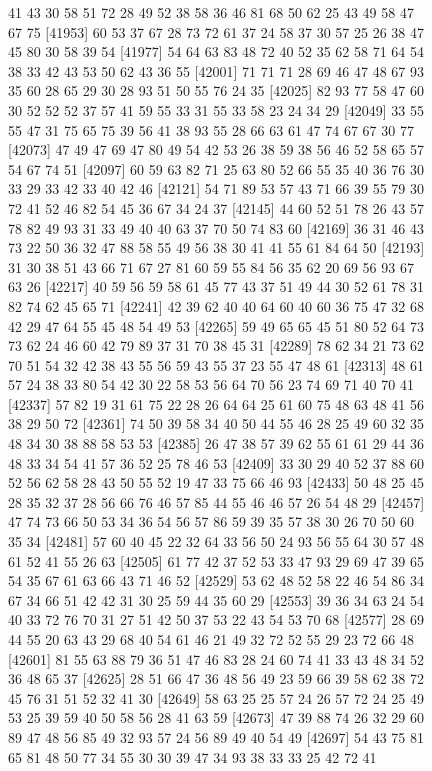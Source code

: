 \documentclass{article}
\begin{document}
\begin{figure}[H]
\begin{Schunk}
\begin{Soutput}
[41929] 41 43 30 58 51 72 28 49 52 38 58 36 46 81 68 50 62 25 43 49 58 47 67 75
[41953] 60 53 37 67 28 73 72 61 37 24 58 37 30 57 25 26 38 47 45 80 30 58 39 54
[41977] 54 64 63 83 48 72 40 52 35 62 58 71 64 54 38 33 42 43 53 50 62 43 36 55
[42001] 71 71 71 28 69 46 47 48 67 93 35 60 28 65 29 30 28 93 51 50 55 76 24 35
[42025] 82 93 77 58 47 60 30 52 52 52 37 57 41 59 55 33 31 55 33 58 23 24 34 29
[42049] 33 55 55 47 31 75 65 75 39 56 41 38 93 55 28 66 63 61 47 74 67 67 30 77
[42073] 47 49 47 69 47 80 49 54 42 53 26 38 59 38 56 46 52 58 65 57 54 67 74 51
[42097] 60 59 63 82 71 25 63 80 52 66 55 35 40 36 76 30 33 29 33 42 33 40 42 46
[42121] 54 71 89 53 57 43 71 66 39 55 79 30 72 41 52 46 82 54 45 36 67 34 24 37
[42145] 44 60 52 51 78 26 43 57 78 82 49 93 31 33 49 40 40 63 37 70 50 74 83 60
[42169] 36 31 46 43 73 22 50 36 32 47 88 58 55 49 56 38 30 41 41 55 61 84 64 50
[42193] 31 30 38 51 43 66 71 67 27 81 60 59 55 84 56 35 62 20 69 56 93 67 63 26
[42217] 40 59 56 59 58 61 45 77 43 37 51 49 44 30 52 61 78 31 82 74 62 45 65 71
[42241] 42 39 62 40 40 64 60 40 60 36 75 47 32 68 42 29 47 64 55 45 48 54 49 53
[42265] 59 49 65 65 45 51 80 52 64 73 73 62 24 46 60 42 79 89 37 31 70 38 45 31
[42289] 78 62 34 21 73 62 70 51 54 32 42 38 43 55 56 59 43 55 37 23 55 47 48 61
[42313] 48 61 57 24 38 33 80 54 42 30 22 58 53 56 64 70 56 23 74 69 71 40 70 41
[42337] 57 82 19 31 61 75 22 28 26 64 64 25 61 60 75 48 63 48 41 56 38 29 50 72
[42361] 74 50 39 58 34 40 50 44 55 46 28 25 49 60 32 35 48 34 30 38 88 58 53 53
[42385] 26 47 38 57 39 62 55 61 61 29 44 36 48 33 34 54 41 57 36 52 25 78 46 53
[42409] 33 30 29 40 52 37 88 60 52 56 62 58 28 43 50 55 52 19 47 33 75 66 46 93
[42433] 50 48 25 45 28 35 32 37 28 56 66 76 46 57 85 44 55 46 46 57 26 54 48 29
[42457] 47 74 73 66 50 53 34 36 54 56 57 86 59 39 35 57 38 30 26 70 50 60 35 34
[42481] 57 60 40 45 22 32 64 33 56 50 24 93 56 55 64 30 57 48 61 52 41 55 26 63
[42505] 61 77 42 37 52 53 33 47 93 29 69 47 39 65 54 35 67 61 63 66 43 71 46 52
[42529] 53 62 48 52 58 22 46 54 86 34 67 34 66 51 42 42 31 30 25 59 44 35 60 29
[42553] 39 36 34 63 24 54 40 33 72 76 70 31 27 51 42 50 37 53 22 43 54 53 70 68
[42577] 28 69 44 55 20 63 43 29 68 40 54 61 46 21 49 32 72 52 55 29 23 72 66 48
[42601] 81 55 63 88 79 36 51 47 46 83 28 24 60 74 41 33 43 48 34 52 36 48 65 37
[42625] 28 51 66 47 36 48 56 49 23 59 66 39 58 62 38 72 45 76 31 51 52 32 41 30
[42649] 58 63 25 25 57 24 26 57 72 24 25 49 53 25 39 59 40 50 58 56 28 41 63 59
[42673] 47 39 88 74 26 32 29 60 89 47 48 56 85 49 32 93 57 24 56 89 49 40 54 49
[42697] 54 43 75 81 65 81 48 50 77 34 55 30 30 39 47 34 93 38 33 33 25 42 72 41

\end{Soutput}
\end{Schunk}
\end{figure}
\end{document}

